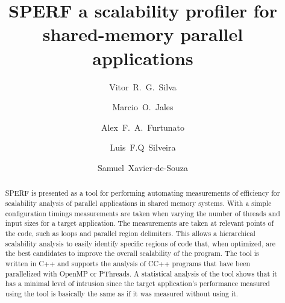 \documentclass[sigconf]{acmart}
\begin{document}
\title{SPERF a scalability profiler for shared-memory parallel applications}

\author{Vitor~R.~G.~Silva}

\author{Marcio~O.~Jales}

\author{Alex~F.~A.~Furtunato}

\author{Luis~F.Q~Silveira}

\author{Samuel~Xavier-de-Souza}


\renewcommand{\shortauthors}{Vitor R. G. Silva et al.}

\begin{abstract}
SPERF is presented as a tool for performing automating measurements of efficiency for scalability analysis of parallel applications in shared memory systems. With a simple configuration timings measurements are taken when varying the number of threads and input sizes for a target application. The measurements are taken at relevant points of the code, such as loops and parallel region delimiters. This allows a hierarchical scalability analysis to easily identify specific regions of code that, when optimized, are the best candidates to improve the overall scalability of the program. The tool is written in C++ and supports the analysis of C\/C++ programs that have been parallelized with OpenMP or PThreads. A statistical analysis of the tool shows that it has a minimal level of intrusion since the target application's performance measured using the tool is basically the same as if it was measured without using it.
\end{abstract}
\end{document}
